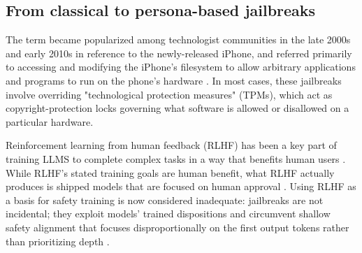 \subsection{From classical to persona-based jailbreaks}
The term became popularized among technologist communities in the late 2000s and early 2010s in reference to the newly-released iPhone, and referred primarily to accessing and modifying the iPhone's filesystem to allow arbitrary applications and programs to run on the phone's hardware \cite{cheng_iphone_2010,wolk_iphone_2010}. In most cases, these jailbreaks involve overriding "technological protection measures" (TPMs), which act as copyright-protection locks governing what software is allowed or disallowed on a particular hardware.

Reinforcement learning from human feedback (RLHF) has been a key part of training LLMS to complete complex tasks in a way that benefits human users \cite{casper_open_2023}. While RLHF's stated training goals are  human benefit, what RLHF actually produces is shipped models that are focused on human approval \cite{casper_open_2023}. Using RLHF as a basis for safety training is now considered inadequate:  jailbreaks are not incidental; they exploit models' trained dispositions and circumvent shallow safety alignment that focuses disproportionally on the first output tokens rather than prioritizing depth \cite{wei_jailbroken_2023, qi_safety_2024, casper_open_2023}. 





